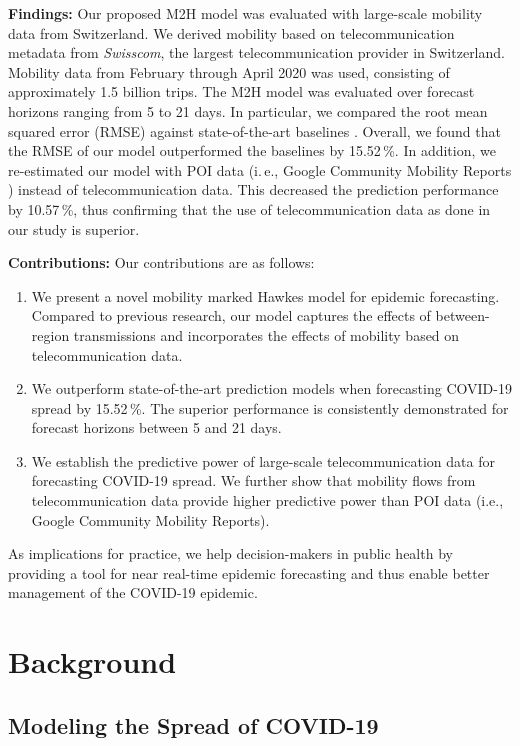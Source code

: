 \documentclass[sigconf, review = false, nonacm = true]{acmart}
\newcommand\model{M2H model\xspace}
\newcommand\ie{i.\,e.\xspace}
\begin{document}
\textbf{Findings:} Our proposed \model was evaluated with large-scale mobility data from Switzerland. We derived mobility based on telecommunication metadata from \emph{Swisscom}, the largest telecommunication provider in Switzerland. Mobility data from February through April 2020 was used, consisting of approximately 1.5 billion trips. The \model was evaluated over forecast horizons ranging from 5 to 21 days. In particular, we compared the root mean squared error (RMSE) against state-of-the-art baselines \cite{chiang_hawkes_2020, wieczorek_neural_2020, persson_monitoring_2021}. Overall, we found that the RMSE of our model outperformed the baselines by 15.52\,\%. In addition, we re-estimated our model with POI data (\ie, Google Community Mobility Reports \cite{google_llc_google_2020}) instead of telecommunication data. This decreased the prediction performance by 10.57\,\%, thus confirming that the use of telecommunication data as done in our study is superior.

\textbf{Contributions:}
Our contributions are as follows:
\begin{enumerate}
    \item We present a novel mobility marked Hawkes model for epidemic forecasting. Compared to previous research, our model captures the effects of between-region transmissions and incorporates the effects of mobility based on telecommunication data. 
    \item We outperform state-of-the-art prediction models when forecasting COVID-19 spread by 15.52\,\%. The superior performance is consistently demonstrated for forecast horizons between 5 and 21 days.
    \item We establish the predictive power of large-scale telecommunication data for forecasting COVID-19 spread. We further show that mobility flows from telecommunication data provide higher predictive power than POI data (i.e., Google Community Mobility Reports).
\end{enumerate}
As implications for practice, we help decision-makers in public health by providing a tool for near real-time epidemic forecasting and thus enable better management of the COVID-19 epidemic.

\section{Background}

\subsection{Modeling the Spread of COVID-19}
\end{document}
